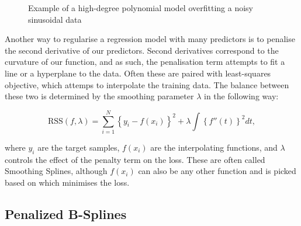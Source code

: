 \begin{figure}
    \centering
    \caption{Example of a high-degree polynomial model overfitting a noisy sinusoidal data}
    \label{fig:overfit}
\end{figure}

Another way to regularise a regression model with many predictors is to penalise the second derivative of our predictors. Second derivatives correspond to the curvature of our function, and as such, the penalisation term attempts to fit a line or a hyperplane to the data. Often these are paired with least-squares objective, which attemps to interpolate the training data. The balance between these two is determined by the smoothing parameter $\lambda$ in the following way:

\begin{equation}
\text{RSS}(f, \lambda) = \sum_{i=1}^{N} \left\{ y_i - f(x_i) \right\}^2 + \lambda \int \left\{ f''(t) \right\}^2 dt,
\label{formula:smoothingsplines}
\end{equation}

where $y_i$ are the target samples, $f(x_i)$ are the interpolating functions, and $\lambda$ controls the effect of the penalty term on the loss. These are often called Smoothing Splines, although $f(x_i)$ can also be any other function and is picked based on which minimises the loss. \cite[151]{HastieTrevor2009EoSL}

\subsection{Penalized B-Splines}

